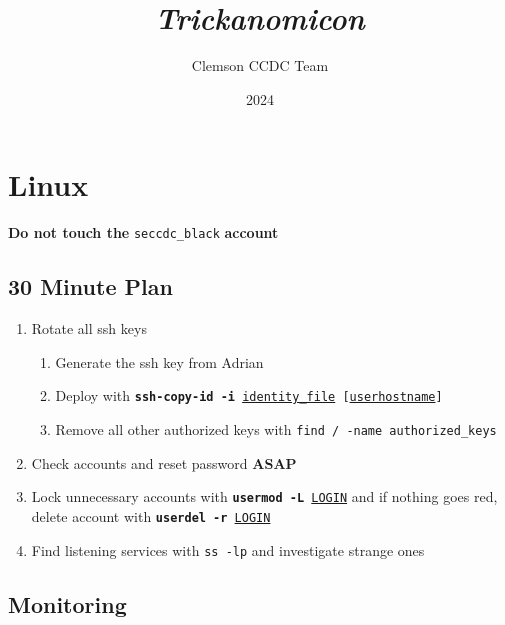 \documentclass[12pt,letterpaper]{article}
\title{\huge{\textit{Trickanomicon}}}
\author{Clemson CCDC Team}
\date{2024}
\def\code#1{\textcolor{c2}{\texttt{#1}}}
\def\bf#1{\textbf{#1}}
\def\ul#1{\underline{#1}}
\begin{document}
\maketitle

\pagebreak

\tableofcontents

\pagebreak

\section{Linux}

\bf{Do not touch the} \code{seccdc\_black} \bf{account}

\subsection{30 Minute Plan}

\begin{enumerate}
	\item Rotate all ssh keys
		\begin{enumerate}
			\item Generate the ssh key from Adrian
			\item Deploy with \code{\bf{ssh-copy-id -i} \ul{identity\_file} [\ul{user}\@\ul{hostname}]}
			\item Remove all other authorized keys with \code{find / -name authorized\_keys}
		\end{enumerate}
	\item Check accounts and reset password \bf{ASAP}
	\item Lock unnecessary accounts with \code{\bf{usermod -L} \ul{LOGIN}} and if nothing goes red, delete account with \code{\bf{userdel -r} \ul{LOGIN}}
	\item Find listening services with \code{ss -lp} and investigate strange ones
\end{enumerate}

\subsection{Monitoring}
\end{document}
